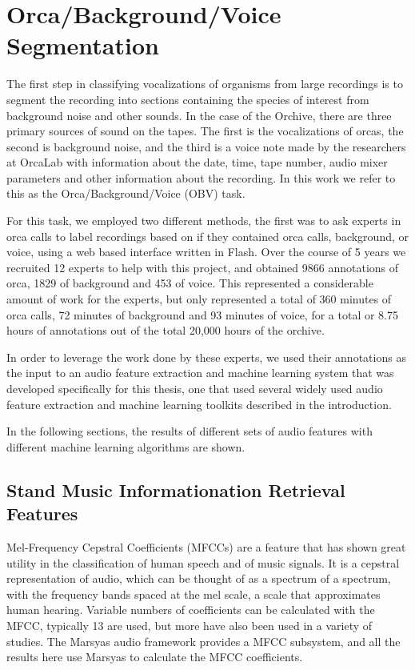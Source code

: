 \documentclass[12pt,oneside]{book}
\begin{document}
\section{Orca/Background/Voice Segmentation}

The first step in classifying vocalizations of organisms from large
recordings is to segment the recording into sections containing the
species of interest from background noise and other sounds.  In the
case of the Orchive, there are three primary sources of sound on the
tapes.  The first is the vocalizations of orcas, the second is
background noise, and the third is a voice note made by the
researchers at OrcaLab with information about the date, time, tape
number, audio mixer parameters and other information about the
recording.  In this work we refer to this as the Orca/Background/Voice
(OBV) task.

For this task, we employed two different methods, the first was to ask
experts in orca calls to label recordings based on if they contained
orca calls, background, or voice, using a web based interface written
in Flash.  Over the course of 5 years we recruited 12 experts to help
with this project, and obtained 9866 annotations of orca, 1829 of
background and 453 of voice.  This represented a considerable amount
of work for the experts, but only represented a total of 360 minutes
of orca calls, 72 minutes of background and 93 minutes of voice, for a
total or 8.75 hours of annotations out of the total 20,000 hours of
the orchive.

In order to leverage the work done by these experts, we used their
annotations as the input to an audio feature extraction and machine
learning system that was developed specifically for this thesis, one
that used several widely used audio feature extraction and machine
learning toolkits described in the introduction.

In the following sections, the results of different sets of audio
features with different machine learning algorithms are shown.


\subsection{Stand Music Informationation Retrieval Features}

Mel-Frequency Cepstral Coefficients (MFCCs) are a feature that has
shown great utility in the classification of human speech and of music
signals.  It is a cepstral representation of audio, which can be
thought of as a spectrum of a spectrum, with the frequency bands
spaced at the mel scale, a scale that approximates human hearing.
Variable numbers of coefficients can be calculated with the MFCC,
typically 13 are used, but more have also been used in a variety of
studies.  The Marsyas audio framework provides a MFCC subsystem, and
all the results here use Marsyas to calculate the MFCC coefficients.
\end{document}
